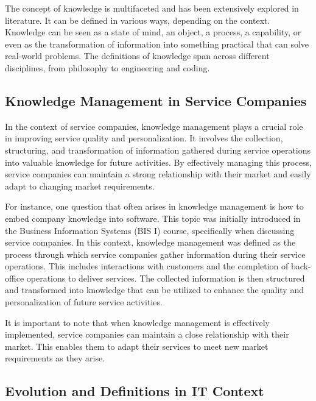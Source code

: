 The concept of knowledge is multifaceted and has been extensively
explored in literature. It can be defined in various ways, depending on
the context. Knowledge can be seen as a state of mind, an object, a
process, a capability, or even as the transformation of information into
something practical that can solve real-world problems. The definitions
of knowledge span across different disciplines, from philosophy to
engineering and coding.

\subsection{Knowledge Management in Service
  Companies}\label{knowledge-management-in-service-companies}

In the context of service companies, knowledge management plays a
crucial role in improving service quality and personalization. It
involves the collection, structuring, and transformation of information
gathered during service operations into valuable knowledge for future
activities. By effectively managing this process, service companies can
maintain a strong relationship with their market and easily adapt to
changing market requirements.

For instance, one question that often arises in knowledge management is
how to embed company knowledge into software. This topic was initially
introduced in the Business Information Systems (BIS I) course,
specifically when discussing service companies. In this context,
knowledge management was defined as the process through which service
companies gather information during their service operations. This
includes interactions with customers and the completion of back-office
operations to deliver services. The collected information is then
structured and transformed into knowledge that can be utilized to
enhance the quality and personalization of future service activities.

It is important to note that when knowledge management is effectively
implemented, service companies can maintain a close relationship with
their market. This enables them to adapt their services to meet new
market requirements as they arise.

\subsection{Evolution and Definitions in IT
  Context}\label{evolution-and-definitions-in-it-context}

